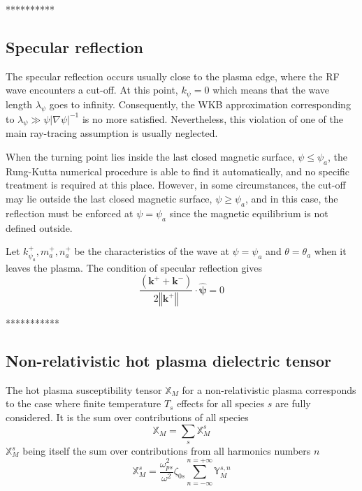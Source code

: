 \documentclass[a4paper,12pt]{article}%
\begin{document}
**********

\subsection{Specular reflection}

The specular reflection occurs usually close to the plasma edge, where the RF
wave encounters a cut-off. At this point, $k_{\psi}=0$ which means that the
wave length $\lambda_{\psi}$ goes to infinity. Consequently, the WKB
approximation corresponding to $\lambda_{\psi}\gg\psi\left\vert \nabla
\psi\right\vert ^{-1}$ is no more satisfied. Nevertheless, this violation of
one of the main ray-tracing assumption is usually neglected.

When the turning point lies inside the last closed magnetic surface, $\psi
\leq\psi_{a}$, the Rung-Kutta numerical procedure is able to find it
automatically, and no specific treatment is required at this place. However,
in some circumstances, the cut-off may lie outside the last closed magnetic
surface, $\psi\geq\psi_{a}$, and in this case, the reflection must be enforced
at $\psi=\psi_{a}$ since the magnetic equilibrium is not defined outside.

Let $k_{\psi_{a}}^{+},m_{a}^{+},n_{a}^{+}$ be the characteristics of the wave
at $\psi=\psi_{a}$ and $\theta=\theta_{a}$ when it leaves the plasma. The
condition of specular reflection gives%
\begin{equation}
\frac{\left(  \mathbf{k}^{+}+\mathbf{k}^{-}\right)  }{2\left\Vert
\mathbf{k}^{+}\right\Vert }\cdot\widehat{\mathbf{\psi}}=0
\end{equation}


***********

\subsection{\bigskip Non-relativistic hot plasma dielectric tensor}

The hot plasma susceptibility tensor $\mathbb{X}_{M}$ for a non-relativistic
plasma corresponds to the case where finite temperature $T_{s}$ effects for
all species $s$ are fully considered. It is the sum over contributions of all
species
\begin{equation}
\mathbb{X}_{M}=\sum_{s}\mathbb{X}_{M}^{s}%
\end{equation}
$\mathbb{X}_{M}^{s}$ being itself the sum over contributions from all
harmonics numbers $n$%
\begin{equation}
\mathbb{X}_{M}^{s}=\frac{\omega_{ps}^{2}}{\omega^{2}}\zeta_{0s}\sum
_{n=-\infty}^{n=+\infty}\mathbb{Y}_{M}^{s,n}%
\end{equation}
\end{document}
